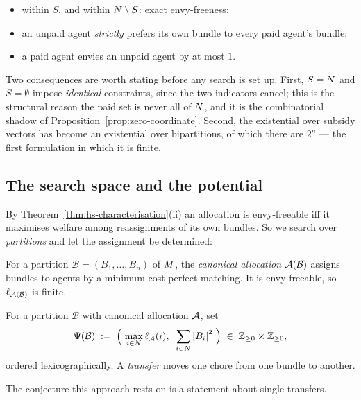 \begin{itemize}
  \item within $S$, and within $N \setminus S$: exact envy-freeness;
  \item an unpaid agent \emph{strictly} prefers its own bundle to every paid
    agent's bundle;
  \item a paid agent envies an unpaid agent by at most $1$.
\end{itemize}

Two consequences are worth stating before any search is set up. First, $S =
N$ and $S = \emptyset$ impose \emph{identical} constraints, since the two
indicators cancel; this is the structural reason the paid set is never all of
$N$, and it is the combinatorial shadow of
Proposition~\ref{prop:zero-coordinate}. Second, the existential over subsidy
vectors has become an existential over bipartitions, of which there are $2^n$ ---
the first formulation in which it is finite.

\subsection{The search space and the potential}

By Theorem~\ref{thm:hs-characterisation}(ii) an allocation is envy-freeable iff
it maximises welfare among reassignments of its own bundles. So we search over
\emph{partitions} and let the assignment be determined:

\begin{definition}
\label{def:canonical}
For a partition $\mathcal B = (B_1,\dots,B_n)$ of $M$, the \emph{canonical
allocation} $\mathcal{A}(\mathcal B)$ assigns bundles to agents by a minimum-cost
perfect matching. It is envy-freeable, so $\ell_{\mathcal{A}(\mathcal B)}$ is finite.
\end{definition}

\begin{definition}
\label{def:potential}
For a partition $\mathcal B$ with canonical allocation $\mathcal{A}$, set
\[
  \Psi(\mathcal B) \;:=\;
  \Bigl(\; \max_{i \in N} \ell_{\mathcal{A}}(i), \;\;
           \sum_{i \in N} \left\lvert B_i\right\rvert^2 \;\Bigr)
  \;\in\; \mathbb{Z}_{\ge 0} \times \mathbb{Z}_{\ge 0},
\]
ordered lexicographically. A \emph{transfer} moves one chore from one bundle to
another.
\end{definition}

The conjecture this approach rests on is a statement about single transfers.

